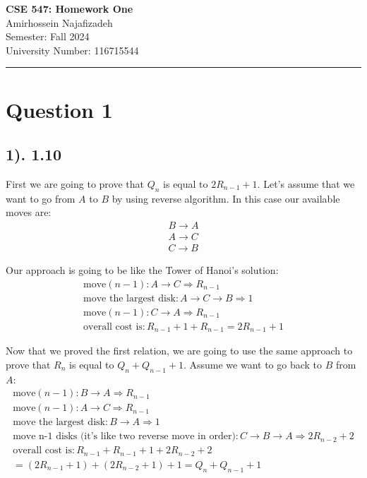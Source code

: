 \documentclass[12pt]{article}
\begin{document}
\begin{center}
    {\LARGE\textbf{CSE 547: Homework One}} \\[1em]
    {\large Amirhossein Najafizadeh} \\[1em]
    Semester: Fall 2024 \\ 
    University Number: 116715544 \\[1em]
    \noindent\rule{\textwidth}{0.6pt}
\end{center}

\section*{Question 1}
\subsection*{1). 1.10}
First we are going to prove that $Q_{n}$ is equal to $2R_{n-1}+1$. Let's assume that we want to go from $A$ to $B$ by using reverse algorithm. In this case our available moves are:
\begin{gather*}
    B \to A \\
    A \to C \\
    C \to B
\end{gather*}

Our approach is going to be like the Tower of Hanoi's solution:
\begin{gather*}
    \text{move} (n-1) : A \to C \Rightarrow R_{n-1} \\
    \text{move the largest disk} : A \to C \to B \Rightarrow 1 \\
    \text{move} (n-1) : C \to A \Rightarrow R_{n-1} \\
    \text{overall cost is} : R_{n-1} + 1 + R_{n-1} = 2R_{n-1} + 1
\end{gather*}

Now that we proved the first relation, we are going to use the same approach to prove that $R_{n}$ is equal to $Q_{n}+Q_{n-1}+1$. Assume we want to go back to $B$ from $A$:
\begin{gather*}
    \text{move} (n-1) : B \to A \Rightarrow R_{n-1} \\
    \text{move} (n-1) : A \to C \Rightarrow R_{n-1} \\
    \text{move the largest disk} : B \to A \Rightarrow 1 \\
    \text{move n-1 disks (it's like two reverse move in order)} : C \to B \to A \Rightarrow 2R_{n-2}+2 \\
    \text{overall cost is} : R_{n-1} + R_{n-1} + 1 + 2R_{n-2} + 2 \\= (2R_{n-1} + 1) + (2R_{n-2} + 1) + 1 = Q_{n} + Q_{n-1} + 1
\end{gather*}
\end{document}
